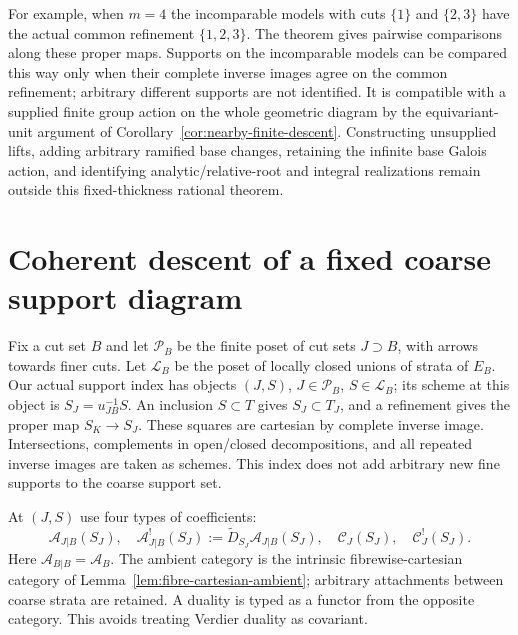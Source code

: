 \documentclass[11pt]{article}
\theoremstyle{definition}
\theoremstyle{remark}
\begin{document}
For example, when $m=4$ the incomparable models with cuts $\{1\}$
and $\{2,3\}$ have the actual common refinement $\{1,2,3\}$.
The theorem gives pairwise comparisons along these proper maps.
Supports on the incomparable models can be compared this way only
when their complete inverse images agree on the common refinement;
arbitrary different supports are not identified.  It is compatible with a supplied finite group action on the
whole geometric diagram by the equivariant-unit argument of
Corollary~\ref{cor:nearby-finite-descent}.  Constructing unsupplied
lifts, adding arbitrary ramified base changes, retaining the infinite
base Galois action, and identifying analytic/relative-root and integral
realizations remain outside this fixed-thickness rational theorem.

\section{Coherent descent of a fixed coarse support diagram}
\label{sec:anchored-descent}
Fix a cut set $B$ and let $\mathcal P_B$ be the finite poset of cut
sets $J\supset B$, with arrows towards finer cuts.  Let $\mathcal L_B$
be the poset of locally closed unions of strata of $E_B$.  Our actual
support index has objects $(J,S)$, $J\in\mathcal P_B$, $S\in\mathcal L_B$;
its scheme at this object is $S_J=u_{JB}^{-1}S$.  An inclusion
$S\subset T$ gives $S_J\subset T_J$, and a refinement gives the proper
map $S_K\to S_J$.  These squares are cartesian by complete inverse
image.  Intersections, complements in open/closed decompositions, and
all repeated inverse images are taken as schemes.  This index does
not add arbitrary new fine supports to the coarse support set.

At $(J,S)$ use four types of coefficients:
\[
 \mathcal A_{J|B}(S_J),\quad
 \mathcal A_{J|B}^{!}(S_J):=\widetilde D_{S_J}
                         \mathcal A_{J|B}(S_J),\quad
 \mathcal C_J(S_J),\quad\mathcal C_J^!(S_J).
\]
Here $\mathcal A_{B|B}=\mathcal A_B$.  The ambient category is the
intrinsic fibrewise-cartesian category of
Lemma~\ref{lem:fibre-cartesian-ambient}; arbitrary attachments between
coarse strata are retained.  A duality is typed as a functor from the
opposite category.  This avoids treating Verdier duality as covariant.
\end{document}
